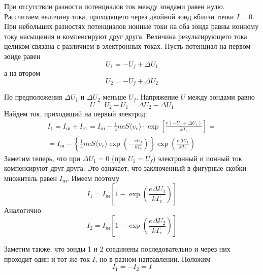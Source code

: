При отсутствии разности потенциалов ток
между зондами равен нулю. Рассчитаем
величину тока, проходящего через двойной
зонд вблизи точки $I = 0$. При небольших
разностях потенциалов ионные токи на оба
зонда равны ионному току насыщения и
компенсируют друг друга. Величина
результирующего тока целиком связана с
различием в электронных токах. Пусть
потенциал на первом зонде равен
\begin{equation}
    U_1 = -U_f + \Delta U_1
\end{equation}
а на втором
\begin{equation}
   U_2 = -U_f + \Delta U_2
\end{equation}

По предположения $\Delta U_1$ и $\Delta
U_2$ меньше $U_f$. Напряжение $U$ между
зондами равно
\begin{equation}
    U=U_2-U_1 = \Delta U_2 - \Delta U_1
\end{equation}
Найдем ток, приходящий на первый
электрод:
\begin{multline*}
    I_1 = I_{i\text{н}} + I_{e1} =
    I_{i\text{н}} - \frac{1}{4}n e S
    \langle \upsilon_e \rangle \cdot
    \exp \left[ \frac{e(-U_f + \Delta
    U_1)}{k T_e}  \right] = \\ =
    I_{i\text{н}} - \left\{ \frac{1}{4} n
    e S \langle \upsilon_e \rangle \exp
    \left(-\frac{e U_f}{k T_e}
        \right)\right\} \exp \left(\frac{e
    \Delta U_1}{k T_e}  \right)
\end{multline*}
Заметим теперь, что при $\Delta U_1 = 0$ 
(при $U_1 = U_f$) электронный и ионный
ток компенсируют друг друга. Это
означает, что заключенный в фигурные
скобки множитель равен $I_{i\text{н}}$.
Имеем поэтому
\begin{equation}
    I_1 = I_{i \text{н}} \left[ 1 - \exp
        \left( \frac{e \Delta U_1}{k T_e}  \right)\right]
\end{equation}
Аналогично
\begin{equation}
    I_2 = I_{i \text{н}} \left[ 1 - \exp
        \left( \frac{e \Delta U_2}{k T_e}  \right)\right]
\end{equation}

Заметим также, что зонды 1 и 2 соединены
последовательно и через них проходит
один и тот же ток $I$, но в разном
направлении. Положим
\begin{equation}
I_1 = - I_2 = I
\end{equation}

